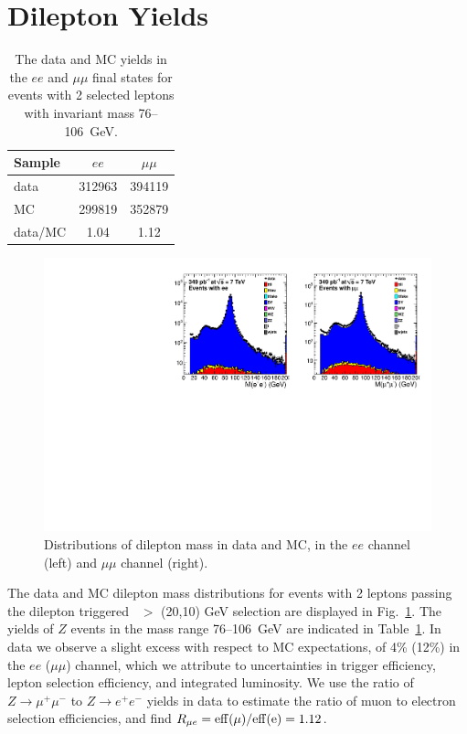 
\section{Dilepton Yields}

\begin{table}[htb]
\begin{center}
\caption{\label{tab:lepyields}
The data and MC yields in the $ee$ and $\mu\mu$ final states for events with 2 selected
leptons with invariant mass 76--106~GeV.
}
\begin{tabular}{l|cc}
\hline
         Sample   &           $ee$   &       $\mu\mu$   \\
\hline
data              &         312963   &         394119   \\
MC                &         299819   &         352879   \\
\hline
data/MC           &           1.04   &           1.12   \\
\hline
\end{tabular}
\end{center}
\end{table}

\begin{figure}[!htb]
\begin{center}
\includegraphics[width=1.0\linewidth]{plots/dilmass_349pb.pdf}
\caption{\label{fig:Z}\protect Distributions of dilepton mass in data and MC,
in the $ee$ channel (left) and $\mu\mu$ channel (right). 
}
\end{center}
\end{figure}

The data and MC dilepton mass distributions for events with 2 leptons passing the dilepton triggered 
\pt\ $>$ (20,10) GeV selection are displayed in Fig.~\ref{fig:Z}.
The yields of $Z$ events in the mass range 76--106~GeV are indicated in Table~\ref{tab:lepyields}. 
In data we observe a slight excess with respect to MC expectations, of 4\% (12\%) in the $ee$ ($\mu\mu$) channel,
which we attribute to uncertainties in trigger efficiency, lepton selection efficiency, and integrated
luminosity. We use the ratio of $Z \to \mu^+\mu^-$ to $Z \to e^+e^-$ yields in data to estimate the
ratio of muon to electron selection efficiencies, and find $R_{\mu e} = \rm{eff}(\mu)/\rm{eff}(e) = 1.12$.

